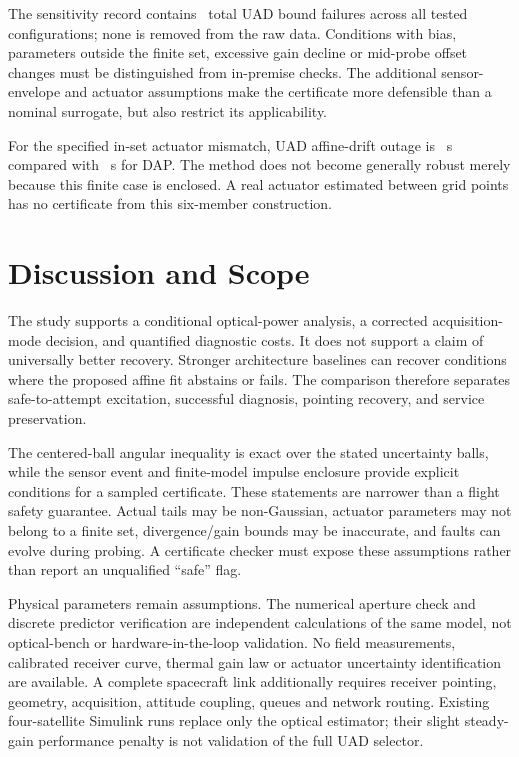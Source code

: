 \documentclass[10pt,journal]{IEEEtran}
\begin{document}
The sensitivity record contains \SensitivityUADBoundFailures\ total UAD bound failures across all tested configurations; none is removed from the raw data. Conditions with bias, parameters outside the finite set, excessive gain decline or mid-probe offset changes must be distinguished from in-premise checks. The additional sensor-envelope and actuator assumptions make the certificate more defensible than a nominal surrogate, but also restrict its applicability.

For the specified in-set actuator mismatch, UAD affine-drift outage is \UADMismatchDriftOutage~s compared with \DAPMismatchDriftOutage~s for DAP. The method does not become generally robust merely because this finite case is enclosed. A real actuator estimated between grid points has no certificate from this six-member construction.

\section{Discussion and Scope}
The study supports a conditional optical-power analysis, a corrected acquisition-mode decision, and quantified diagnostic costs. It does not support a claim of universally better recovery. Stronger architecture baselines can recover conditions where the proposed affine fit abstains or fails. The comparison therefore separates safe-to-attempt excitation, successful diagnosis, pointing recovery, and service preservation.

The centered-ball angular inequality is exact over the stated uncertainty balls, while the sensor event and finite-model impulse enclosure provide explicit conditions for a sampled certificate. These statements are narrower than a flight safety guarantee. Actual tails may be non-Gaussian, actuator parameters may not belong to a finite set, divergence/gain bounds may be inaccurate, and faults can evolve during probing. A certificate checker must expose these assumptions rather than report an unqualified ``safe'' flag.

Physical parameters remain assumptions. The numerical aperture check and discrete predictor verification are independent calculations of the same model, not optical-bench or hardware-in-the-loop validation. No field measurements, calibrated receiver curve, thermal gain law or actuator uncertainty identification are available. A complete spacecraft link additionally requires receiver pointing, geometry, acquisition, attitude coupling, queues and network routing. Existing four-satellite Simulink runs replace only the optical estimator; their slight steady-gain performance penalty is not validation of the full UAD selector.
\end{document}
